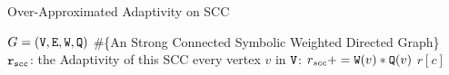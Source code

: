     \begin{algorithm}
      \caption{
      {Over-Approximated Adaptivity on SCC}
      \label{alg:overadp_alg}
      }
      \begin{algorithmic}[1]
      \REQUIRE $G = (\mathtt{V}, \mathtt{E}, \mathtt{W}, \mathtt{Q})$ \#\{An Strong Connected Symbolic Weighted Directed Graph\}
      \\
      $\mathtt{r_{scc}}$: the Adaptivity of this SCC
       every vertex $v$ in $\mathtt{V}$:
      \STATE  \qquad $r_{scc} += \mathtt{W}(v)*\mathtt{Q}(v)$  
      \RETURN $r[c]$
      \end{algorithmic}
      \end{algorithm}
